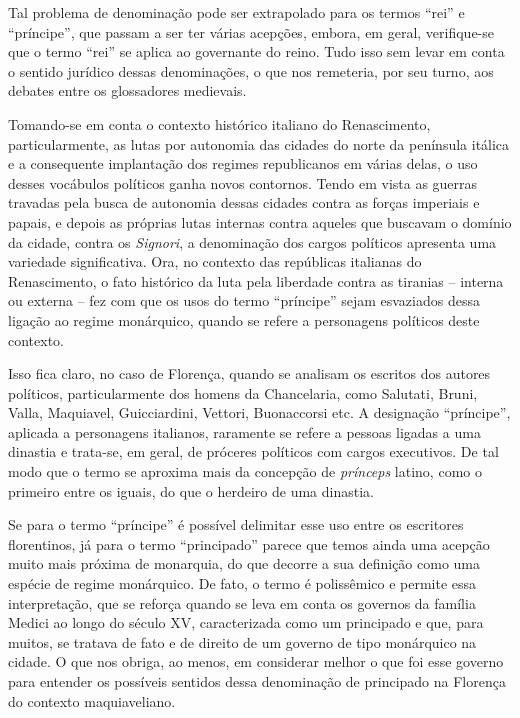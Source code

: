 Tal problema de denominação pode ser extrapolado para os termos ``rei''
e ``príncipe'', que passam a ser ter várias acepções, embora, em geral,
verifique-se que o termo ``rei'' se aplica ao governante do reino. Tudo
isso sem levar em conta o sentido jurídico dessas denominações, o que
nos remeteria, por seu turno, aos debates entre os glossadores
medievais.

Tomando-se em conta o contexto histórico italiano do Renascimento,
particularmente, as lutas por autonomia das cidades do norte da
península itálica e a consequente implantação dos regimes republicanos
em várias delas, o uso desses vocábulos políticos ganha novos contornos.
Tendo em vista as guerras travadas pela busca de autonomia dessas
cidades contra as forças imperiais e papais, e depois as próprias lutas
internas contra aqueles que buscavam o domínio da cidade, contra os
\emph{Signori}, a denominação dos cargos políticos apresenta uma
variedade significativa. Ora, no contexto das repúblicas italianas do
Renascimento, o fato histórico da luta pela liberdade contra as tiranias
-- interna ou externa -- fez com que os usos do termo ``príncipe'' sejam
esvaziados dessa ligação ao regime monárquico, quando se refere a
personagens políticos deste contexto.

Isso fica claro, no caso de Florença, quando se analisam os escritos dos
autores políticos, particularmente dos homens da Chancelaria, como
Salutati, Bruni, Valla, Maquiavel, Guicciardini, Vettori, Buonaccorsi
etc. A designação ``príncipe'', aplicada a personagens italianos,
raramente se refere a pessoas ligadas a uma dinastia e trata-se, em
geral, de próceres políticos com cargos executivos. De tal modo que o
termo se aproxima mais da concepção de \emph{prínceps} latino, como o
primeiro entre os iguais, do que o herdeiro de uma dinastia.

Se para o termo ``príncipe'' é possível delimitar esse uso entre os
escritores florentinos, já para o termo ``principado'' parece que temos
ainda uma acepção muito mais próxima de monarquia, do que decorre a sua
definição como uma espécie de regime monárquico. De fato, o termo é
polissêmico e permite essa interpretação, que se reforça quando se leva
em conta os governos da família Medici ao longo do século XV,
caracterizada como um principado e que, para muitos, se tratava de fato
e de direito de um governo de tipo monárquico na cidade. O que nos
obriga, ao menos, em considerar melhor o que foi esse governo para
entender os possíveis sentidos dessa denominação de principado na
Florença do contexto maquiaveliano.

